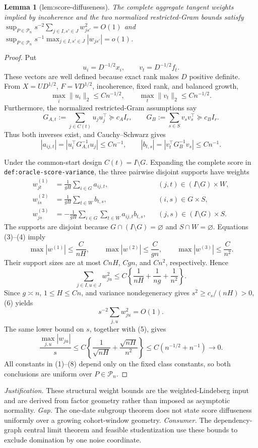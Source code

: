 \documentclass{article}
\newtheorem{lemma}{Lemma}
\begin{document}
\begin{lemma}[lem:score-diffuseness]\label{lem:score-diffuseness}
The complete aggregate tangent weights implied by incoherence and the two normalized restricted-Gram bounds satisfy \(\sup_{P\in\mathcal P_n}s^{-2}\sum_{j\in I,s'\in J}w_{js'}^2=O(1)\) and \(\sup_{P\in\mathcal P_n}s^{-1}\max_{j\in I,s'\in J}|w_{js'}|=o(1)\).
\end{lemma}
\begin{proof}
Put
\[
 u_i=D^{-1/2}x_i,
 \qquad v_t=D^{-1/2}f_t.
\]
These vectors are well defined because exact rank makes \(D\) positive definite.  From \(X=UD^{1/2}\), \(F=VD^{1/2}\), incoherence, fixed rank, and balanced growth,
\[
 \max_i\|u_i\|_2\le Cn^{-1/2},
 \qquad
 \max_t\|v_t\|_2\le Cn^{-1/2}.
 \tag{1}
\]
Furthermore, the normalized restricted-Gram assumptions say
\[
 G_{A,t}:=\sum_{j\in C(t)}u_ju_j^{\top}\succeq c_AI_r,
 \qquad
 G_B:=\sum_{s\in S}v_sv_s^{\top}\succeq c_BI_r.
 \tag{2}
\]
Thus both inverses exist, and Cauchy--Schwarz gives
\[
 |a_{ij,t}|=|u_i^{\top}G_{A,t}^{-1}u_j|\le Cn^{-1},
 \qquad
 |b_{t,s}|=|v_t^{\top}G_B^{-1}v_s|\le Cn^{-1}.
 \tag{3}
\]

Under the common-start design \(C(t)=I\setminus G\).  Expanding the complete score in \texttt{def:oracle-score-variance}, the three pairwise disjoint supports have weights
\[
 \begin{aligned}
 w^{(1)}_{jt}&=\frac1{gH}\sum_{i\in G}a_{ij,t},
 &&(j,t)\in(I\setminus G)\times W,\\
 w^{(2)}_{is}&=\frac1{gH}\sum_{t\in W}b_{t,s},
 &&(i,s)\in G\times S,\\
 w^{(3)}_{js}&=-\frac1{gH}\sum_{i\in G}\sum_{t\in W}
 a_{ij,t}b_{t,s},
 &&(j,s)\in(I\setminus G)\times S.
 \end{aligned}
 \tag{4}
\]
The supports are disjoint because \(G\cap(I\setminus G)=\varnothing\) and \(S\cap W=\varnothing\).  Equations (3)--(4) imply
\[
 \max|w^{(1)}|\le\frac{C}{nH},
 \qquad
 \max|w^{(2)}|\le\frac{C}{gn},
 \qquad
 \max|w^{(3)}|\le\frac{C}{n^2}.
 \tag{5}
\]
Their support sizes are at most \(CnH\), \(Cgn\), and \(Cn^2\), respectively.  Hence
\[
 \sum_{j\in I,u\in J}w_{ju}^2
 \le C\left\{\frac1{nH}+\frac1{ng}+\frac1{n^2}\right\}.
 \tag{6}
\]
Since \(g\asymp n\), \(1\le H\le Cn\), and variance nondegeneracy gives \(s^2\ge c_s/(nH)>0\), (6) yields
\[
 s^{-2}\sum_{j,u}w_{ju}^2=O(1).
 \tag{7}
\]
The same lower bound on \(s\), together with (5), gives
\[
 \frac{\max_{j,u}|w_{ju}|}{s}
 \le C\left\{\frac1{\sqrt{nH}}+
 \frac{\sqrt{nH}}{n^2}\right\}
 \le C(n^{-1/2}+n^{-1})\longrightarrow0.
 \tag{8}
\]
All constants in (1)--(8) depend only on the fixed class constants, so both conclusions are uniform over \(P\in\mathcal P_n\).
\end{proof}
\par\smallskip\noindent \textit{Justification.} These structural weight bounds are the weighted-Lindeberg input and are derived from factor geometry rather than imposed as asymptotic normality. \textit{Gap.} The one-date subgroup theorem does not state score diffuseness uniformly over a growing cohort-window geometry. \textit{Consumer.} The dependency-graph central limit theorem and feasible studentization use these bounds to exclude domination by one noise coordinate.
\end{document}
